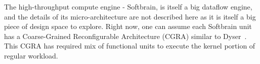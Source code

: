 The high-throughput compute engine - Softbrain, is itself a big dataflow engine, and the details of
its micro-architecture are not described here as it is itself a big piece of design space to explore. 
Right now, one can assume each Softbrain unit has a Coarse-Grained Reconfigurable Architecture (CGRA) similar to Dyser~\cite{ieeemicro12:dyser}.
This CGRA has required mix of functional units to execute the kernel portion of regular workload. 


